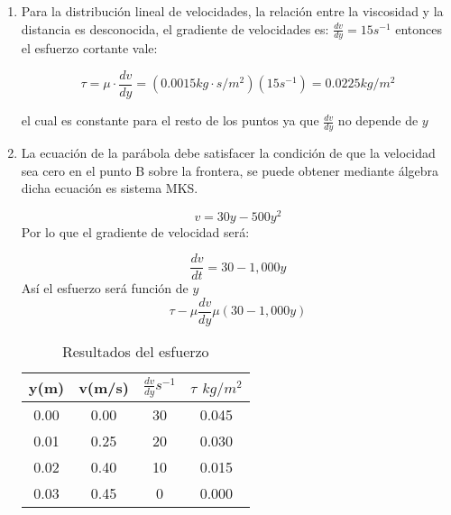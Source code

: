 \begin{enumerate}
    \item Para la distribución lineal de velocidades, la relación entre la viscosidad y la distancia es desconocida, el gradiente de velocidades es: $\frac{dv}{dy}=15s^{-1}$ entonces el esfuerzo cortante vale:

    \begin{equation*}
        \tau=\mu\cdot \frac{dv}{dy}=\left(0.0015kg\cdot s/m^2\right)\left(15s^{-1}\right)=0.0225kg/m^2
    \end{equation*}
    
    el cual es constante para el resto de los puntos ya que $\frac{dv}{dy}$ no depende de $y$
    \item La ecuación de la parábola debe satisfacer la condición de que la velocidad sea cero en el punto B sobre la frontera, se puede obtener mediante álgebra dicha ecuación es sistema MKS.

    \begin{equation*}
        v=30y-500y^2
    \end{equation*}
    Por lo que el gradiente de velocidad será:
    
    \begin{equation*}
        \frac{dv}{dt}=30-1,000y
    \end{equation*}
    Así el esfuerzo será función de $y$
    \begin{equation*}
        \tau-\mu\frac{dv}{dy}\mu\left(30-1,000y\right)
    \end{equation*}
    
    \begin{table}[h!]
        \centering
        \begin{tabular}{@{}cccc@{}}
        \toprule
        y(m) & v(m/s) & $\frac{dv}{dy}s^{-1}$ & $\tau$ $kg/m^2$ \\ \midrule
        0.00 & 0.00   & 30                    & 0.045           \\
        0.01 & 0.25   & 20                    & 0.030           \\
        0.02 & 0.40   & 10                    & 0.015           \\
        0.03 & 0.45   & 0                     & 0.000           \\ \bottomrule
        \end{tabular}
        \caption{Resultados del esfuerzo}
        \label{tabhb3}
        \end{table}
    
\end{enumerate}

